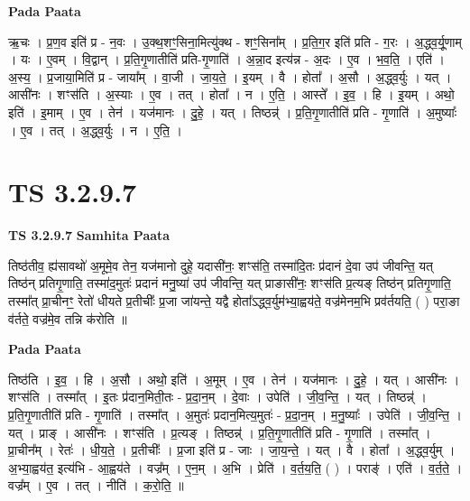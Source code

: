 \documentclass[17pt]{extarticle}
\begin{document}
\textbf{Pada Paata} \newline

ऋ॒चः । प्र॒ण॒व इति॑ प्र - न॒वः । उ॒क्थ॒शꣳ॒॒सिना॒मित्यु॑क्थ - शꣳ॒॒सिना᳚म् । प्र॒ति॒ग॒र इति॑ प्रति - ग॒रः । अ॒द्ध्व॒र्यू॒णाम् । यः । ए॒वम् । वि॒द्वान् । प्र॒ति॒गृ॒णातीति॑ प्रति-गृ॒णाति॑ । अ॒न्ना॒द इत्य॑न्न - अ॒दः । ए॒व । भ॒व॒ति॒ । एति॑ । अ॒स्य॒ । प्र॒जाया॒मिति॑ प्र - जाया᳚म् । वा॒जी । जा॒य॒ते॒ । इ॒यम् । वै । होता᳚ । अ॒सौ । अ॒द्ध्व॒र्युः । यत् । आसी॑नः । शꣳस॑ति । अ॒स्याः । ए॒व । तत् । होता᳚ । न । ए॒ति॒ । आस्ते᳚ । इ॒व॒ । हि । इ॒यम् । अथो॒ इति॑ । इ॒माम् । ए॒व । तेन॑ । यज॑मानः । दु॒हे॒ । यत् । तिष्ठन्न्॑ । प्र॒ति॒गृ॒णातीति॑ प्रति - गृ॒णाति॑ । अ॒मुष्याः᳚ । ए॒व । तत् । अ॒द्ध्व॒र्युः । न । ए॒ति॒ ।  \newline





\section{ TS 3.2.9.7 }

\textbf{TS 3.2.9.7 } \newline
\textbf{Samhita Paata} \newline

तिष्ठ॑तीव॒ ह्य॑सावथो॑ अ॒मूमे॒व तेन॒ यज॑मानो दुहे॒ यदासी॑नः॒ शꣳस॑ति॒ तस्मा॑दि॒तः प्र॑दानं दे॒वा उप॑ जीवन्ति॒ यत् तिष्ठ॑न् प्रतिगृ॒णाति॒ तस्मा॑द॒मुतः॑ प्रदानं मनु॒ष्या॑ उप॑ जीवन्ति॒ यत् प्राङासी॑नः॒ शꣳस॑ति प्र॒त्यङ् तिष्ठ॑न् प्रतिगृ॒णाति॒ तस्मा᳚त् प्रा॒चीनꣳ॒॒ रेतो॑ धीयते प्र॒तीचीः᳚ प्र॒जा जा॑यन्ते॒ यद्वै होता᳚ऽद्ध्व॒र्युम॑भ्या॒ह्वय॑ते॒ वज्र॑मेनम॒भि प्रव॑र्तयति॒ ( ) परा॒ङा व॑र्तते॒ वज्र॑मे॒व तन्नि क॑रोति ॥ \newline

\textbf{Pada Paata} \newline

तिष्ठ॑ति । इ॒व॒ । हि । अ॒सौ । अथो॒ इति॑ । अ॒मूम् । ए॒व । तेन॑ । यज॑मानः । दु॒हे॒ । यत् । आसी॑नः । शꣳस॑ति । तस्मा᳚त् । इ॒तः प्र॑दान॒मिती॒तः - प्र॒दा॒न॒म् । दे॒वाः । उपेति॑ । जी॒व॒न्ति॒ । यत् । तिष्ठन्न्॑ । प्र॒ति॒गृ॒णातीति॑ प्रति - गृ॒णाति॑ । तस्मा᳚त् । अ॒मुतः॑ प्रदान॒मित्य॒मुतः॑ - प्र॒दा॒न॒म् । म॒नु॒ष्याः᳚ । उपेति॑ । जी॒व॒न्ति॒ । यत् । प्राङ् । आसी॑नः । शꣳस॑ति । प्र॒त्यङ् । तिष्ठन्न्॑ । प्र॒ति॒गृ॒णातीति॑ प्रति - गृ॒णाति॑ । तस्मा᳚त् । प्रा॒चीन᳚म् । रेतः॑ । धी॒य॒ते॒ । प्र॒तीचीः᳚ । प्र॒जा इति॑ प्र - जाः । जा॒य॒न्ते॒ । यत् । वै । होता᳚ । अ॒द्ध्व॒र्युम् । अ॒भ्या॒ह्वय॑त॒ इत्य॑भि - आ॒ह्वय॑ते । वज्र᳚म् । ए॒न॒म् । अ॒भि । प्रेति॑ । व॒र्त॒य॒ति॒ ( ) । पराङ्॑ । एति॑ । व॒र्त॒ते॒ । वज्र᳚म् । ए॒व । तत् । नीति॑ । क॒रो॒ति॒ ॥  \newline
\end{document}

